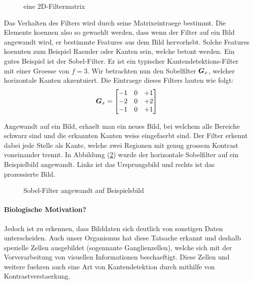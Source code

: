 \documentclass[../main]{subfiles}
\begin{document}
\begin{figure}[h!]
  \caption{eine 2D-Filtermatrix}
  \label{fig:filtermatrix}
\end{figure}
\para{}
Das Verhalten des Filters wird durch seine Matrixeintraege bestimmt.
Die Elemente koennen also so gewaehlt werden, dass wenn der Filter auf ein Bild
angewandt wird, er bestimmte Features aus dem Bild hervorhebt. Solche Features
koennten zum Beispiel Raender oder Kanten sein, welche betont werden.
\para{}
Ein gutes Beispiel ist der Sobel-Filter. Er ist ein typischer Kantendetektions-Filter mit einer
Groesse von $f = 3$. Wir betrachten nun den Sobelfilter $\bm{G}_x$, welcher
horizontale Kanten akzentuiert. Die Eintraege dieses Filters lauten wie folgt:
\begin{equation*}
  \bm{G}_x =
  \begin{bmatrix}
    -1 & 0 & +1 \\
    -2 & 0 & +2 \\
    -1 & 0 & +1 \\
  \end{bmatrix}
\end{equation*}

Angewandt auf ein Bild, erhaelt man ein neues Bild, bei welchem alle Bereiche
schwarz sind und die erkannten Kanten weiss eingefaerbt sind. Der Filter erkennt
dabei jede Stelle als Kante, welche zwei Regionen mit genug grossem Kontrast
voneinander trennt.
In Abbildung (\ref{fig:sobel_filter}) wurde der horizontale Sobelfilter auf ein
Beispielbild angewandt. Links ist das Ursprungsbild und rechts ist das
prozessierte Bild.


\begin{figure}[h!]

  \caption{Sobel-Filter angewandt auf Beispielsbild}
  \label{fig:sobel_filter}
\end{figure}

\para{}
\cite{wiki:sobel_operator}
\cite{deeplearning.ai:cnn}
\cite{wiki:kernel}

\paragraph{Biologische Motivation?}
Jedoch ist zu erkennen, dass Bilddaten sich deutlich von sonstigen Daten unterscheiden.
Auch unser Organismus hat diese Tatsache erkannt und deshalb spezielle Zellen
ausgebildet (sogennante Ganglienzellen), welche sich mit der Vorverarbeitung von
visuellen Informationen beschaeftigt. Diese Zellen und weitere fuehren auch eine
Art von Kantendetektion durch mithilfe von Kontrastverstaerkung.
\end{document}
